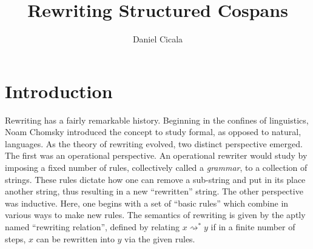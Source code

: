\documentclass{amsart}
\author{Daniel Cicala}
\title{Rewriting Structured Cospans}
\newcommand{\deriv}[2]{#1 \rightsquigarrow^\ast #2}
\theoremstyle{remark}
\theoremstyle{definition}
\begin{document}
\maketitle{}


\section{Introduction}
\label{sec:Introduction}

Rewriting has a fairly remarkable history. Beginning in the confines
of linguistics, Noam Chomsky \cite{Chomsky} introduced the concept to
study formal, as opposed to natural, languages. As the theory of
rewriting evolved, two distinct perspective emerged. The first was an
operational perspective. An operational rewriter would study by
imposing a fixed number of rules, collectively called a
\emph{grammar}, to a collection of strings. These rules dictate how
one can remove a sub-string and put in its place another string, thus
resulting in a new ``rewritten'' string.  The other perspective was
inductive.  Here, one begins with a set of ``basic rules'' which
combine in various ways to make new rules. The semantics of rewriting
is given by the aptly named ``rewriting relation'', defined by
relating $ \deriv{x}{y} $ if in a finite number of steps, $ x $ can be
rewritten into $ y $ via the given rules.
\end{document}
